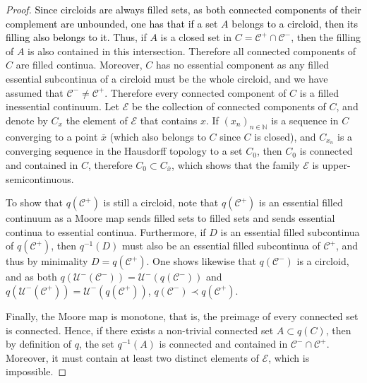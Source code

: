 \documentclass[12pt,a4paper]{amsart}
\theoremstyle{definition}
\theoremstyle{remark}
\newcommand{\N}{\mathbb{N}}
\newcommand{\A}{\mathbb{A}}
\begin{document}
\begin{proof}
\textcolor{black}{ Since circloids are always filled sets, as both connected components of their complement are unbounded, one has that if a set $A$ belongs to a circloid, then its filling also belongs to it.} Thus, if $A$ is a closed set in $C=\mathcal{C}^{+}\cap\mathcal{C}^{-}$, then the filling of $A$ is also contained in this intersection. Therefore all connected components of $C$ are filled continua. Moreover, $C$ has no essential component as any filled essential subcontinua of a circloid must be the whole circloid, and we have assumed that $\mathcal{C}^{-}\not=\mathcal{C}^{+}$. Therefore every connected component of $C$ is a filled inessential continuum. Let $\mathcal{E}$ be the collection of connected components of $C$, and denote by $C_x$ the element of $\mathcal{E}$ that contains $x$. If $(x_n)_{n\in\N}$ is a sequence in $C$ converging to a point $\overline{x}$ (which also belongs to $C$ since $C$ is closed), and $C_{x_n}$ is a  converging sequence in the Hausdorff topology to a set $C_0$, then $C_0$ is connected and contained in $C$, therefore $C_0\subset C_{\overline{x}}$,  which shows that the family $\mathcal{E}$ is upper-semicontinuous. 

To show that $q(\mathcal{C}^{+})$ is still a circloid, note that $q(\mathcal{C}^{+})$ is an essential filled continuum as a Moore map sends filled sets to filled sets and sends essential continua to essential continua. Furthermore, if $D$ is an essential filled subcontinua of $q(\mathcal{C}^{+})$, then $q^{-1}(D)$ must also be an essential filled subcontinua of $\mathcal{C}^{+}$, and thus by minimality $D=q(\mathcal{C}^+)$.  One shows likewise that $q(\mathcal{C}^{-})$ is a circloid, and as both $q(\mathcal{U}^{-}(\mathcal{C}^{-}))=\mathcal{U}^{-}(q(\mathcal{C}^-))$ and $q(\mathcal{U}^{-}(\mathcal{C}^{+}))=\mathcal{U}^{-}(q(\mathcal{C}^+))$, $q(\mathcal{C}^{-})\prec q(\mathcal{C}^{+})$. 


Finally, the Moore map is monotone, that is, the preimage of every connected set is connected. Hence, if there exists a non-trivial connected set $A \subset q(C)$, then by definition of $q$, the set $q^{-1}(A)$ is connected and contained in $\mathcal{C}^- \cap \mathcal{C}^+$. Moreover, it must contain at least two distinct elements of $\mathcal{E}$, which is impossible.

\end{proof}
\end{document}
